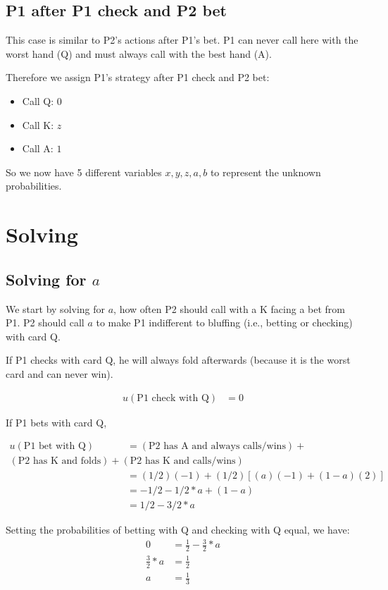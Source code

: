 \documentclass[12pt]{article}
\begin{document}
\subsection{P1 after P1 check and P2 bet}
This case is similar to P2's actions after P1's bet. P1 can never call here with the worst hand (Q) and must always call with the best hand (A). 

Therefore we assign P1's strategy after P1 check and P2 bet:
\begin{itemize}
\item Call Q: $0$
\item Call K: $z$
\item Call A: $1$
\end{itemize}


So we now have 5 different variables $x, y, z, a, b$ to represent the unknown probabilities. 

\section{Solving}

\subsection{Solving for $a$}
We start by solving for $a$, how often P2 should call with a K facing a bet from P1. 
P2 should call $a$ to make P1 indifferent to bluffing (i.e., betting or checking) with card Q. 

\par If P1 checks with card Q, he will always fold afterwards (because it is the worst card and can never win). 

\begin{align}
   u(\textrm{P1 check with Q}) &= 0      
\end{align}


\par If P1 bets with card Q, 

\begin{align}
u(\textrm{P1 bet with Q}) &= (\textrm{P2 has A and always calls/wins}) + \\ (\textrm{P2 has K and folds}) + (\textrm{P2 has K and calls/wins}) \\
&= (1/2)(-1) + (1/2)[(a)(-1) + (1-a)(2)] \\
&= -1/2 - 1/2 * a + (1-a) \\
&= 1/2 - 3/2 * a
\end{align}

Setting the probabilities of betting with Q and checking with Q equal, we have:
\begin{align}
   0 &= \frac{1}{2} - \frac{3}{2} * a \\        
   \frac{3}{2} * a  &= \frac{1}{2} \\
    a &= \frac{1}{3}
\end{align}
\end{document}
